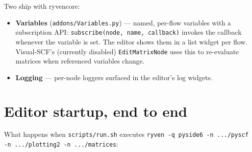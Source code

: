 \documentclass[10pt,a4paper]{article}
\newcommand{\code}[1]{\texttt{\small #1}}
\begin{document}
Two ship with ryvencore:

\begin{itemize}
\item \textbf{Variables} (\code{addons/Variables.py}) --- named, per-flow variables
      with a subscription API: \code{subscribe(node, name, callback)} invokes the
      callback whenever the variable is set. The editor shows them in a list widget
      per flow. Visual-SCF's (currently disabled) \code{EditMatrixNode} uses this to
      re-evaluate matrices when referenced variables change.
\item \textbf{Logging} --- per-node loggers surfaced in the editor's log widgets.
\end{itemize}

\section{Editor startup, end to end}

What happens when \code{scripts/run.sh} executes
\code{ryven -q pyside6 -n .../pyscf -n .../plotting2 -n .../matrices}:
\end{document}
